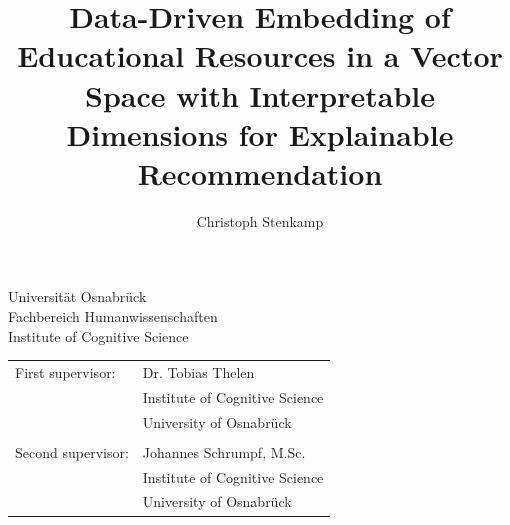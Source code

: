 \documentclass[11pt,
  paper=a4, 
  hidelinks,
  bibliography=totocnumbered,
  captions=tableheading,
  BCOR=5mm,
]{scrreprt}
\title{Data-Driven Embedding of Educational Resources in a Vector Space with Interpretable Dimensions for Explainable Recommendation}
\author{Christoph Stenkamp}
\theoremstyle{plain}
\theoremstyle{definition}
\begin{document}
\let\hypercontentsline=\contentsline
\renewcommand{\contentsline}[4]{\hypertarget{toc.#4}{}\hypercontentsline{#1}{#2}{#3}{#4}}

\cleardoublepage
\pagestyle{plain} %



\begin{titlepage}
	\begin{flushleft}
		Universität Osnabrück\\
		Fachbereich Humanwissenschaften\\
		Institute of Cognitive Science
	\end{flushleft}

	\vspace{2cm}
	\vspace{1cm}

	\begin{tabular}{ll}
		First supervisor:  & Dr. Tobias Thelen          \\
		                   & Institute of Cognitive Science \\
		                   & University of Osnabrück  \\\\
		Second supervisor: & Johannes Schrumpf, M.Sc.         \\
		                   & Institute of Cognitive Science \\
		                   & University of Osnabrück
	\end{tabular}

\end{titlepage}

\cleardoublepage
\end{document}
